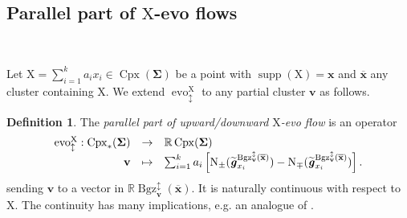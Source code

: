 \documentclass[11pt,reqno]{amsart}
\newcommand{\Neptune}{\mathord{\text{\tikz[baseline=-.5ex,scale=.13]{\draw[line width=.45pt] (0,0)--(0,1.8) (-.6,1.8)--(-.6,.8)--(.6,.8)--(.6,1.8) (-.35,.35)--(.35,.35);}}}}
\theoremstyle{plain}
\theoremstyle{definition}
\newtheorem{definition}[theorem]{Definition}
\numberwithin{equation}{section}
\newcommand\RR{\mathbb{R}}
\newcommand\<{\langle}
\renewcommand\>{\rangle}
\newcommand{\on}[1]{\operatorname{#1}}
\def\CCx{\on{Cpx}}   %
\def\scc{\underline{\on{cell}}}  %
\def\vv{\mathbf{v}}
\def\sink{X}
\newcommand{\flowd}[1]{\on{evo}^{#1}_{\downarrow}}
\newcommand{\flowu}[1]{\on{evo}^{#1}_{\uparrow}}
\newcommand{\flowdu}[1]{\on{evo}_{\updownarrow}^{#1}}
\newcommand{\ccpt}[1]{\mathrm{#1}}%
\def\xevo{\ccpt{X}}%
\newcommand{\bfit}[1]{\textbf{\textit{#1}}}
\newcommand{\ubf}[1]{\underline{\mathbf{#1}}}
\def\seeds{\mathbf{\Sigma}}
\def\xx{\mathbf{x}}%
\def\gvec{\bfit{g}}
\def\Cmat{{C}}
\def\coex{a}
\def\supp{\on{supp}}
\def\opstar{\diamond}
\newcommand{\Bgzp}[2]{\operatorname{Bgz}^{\uparrow}_{#2}(#1)}
\newcommand{\Bgzm}[2]{\operatorname{Bgz}^{\downarrow}_{#2}(#1)}
\newcommand{\Bgzpm}[2]{\operatorname{Bgz}^{\updownarrow}_{#2}(#1)}
\newcommand{\suppdu}[1]{\operatorname{\Neptune}_{\updownarrow}^{#1}}
\newcommand{\ol}[1]{\overline{#1}}
\def\sCpx{\RR\CCx}
\def\normal{\on{N}}
\def\tgvec{\widetilde{\gvec}}
\begin{document}
\subsection{Parallel part of $\xevo$-evo flows}\label{sec:pevo}\

Let $\xevo=\sum_{i=1}^k\coex_i x_i\in\CCx(\seeds)$ be a point  with $\supp(\xevo)=\xx$ and $\ol{\xx}$ any cluster containing $\xevo$.
We extend $\flowdu{\xevo}$ to any partial cluster $\vv$ as follows.

\begin{definition}\label{def:parallel}
The \emph{parallel part of upward/downward $\xevo$-evo flow} is an operator
\begin{equation}\label{eq:flow}
\begin{array}{rcl}
\flowdu{\xevo}:
\CCx_*(\seeds) &\to    &\sCpx(\seeds)\\
\vv            &\mapsto           &\sum_{i=1}^k \coex_i\left[\normal_\pm(\tgvec^{\Bgzpm{\ol{\xx}}{\vv}}_{x_i})-\normal_\mp(\tgvec^{\Bgzpm{\ol{\xx}}{\vv}}_{x_i})\right].
\end{array}
\end{equation}
sending $\vv$ to a vector in $\RR\Bgzpm{\ol{\xx}}{\vv}$.
It is naturally continuous with respect to $\xevo$.
The continuity has many implications, e.g. an analogue of .
\end{definition}
\end{document}
